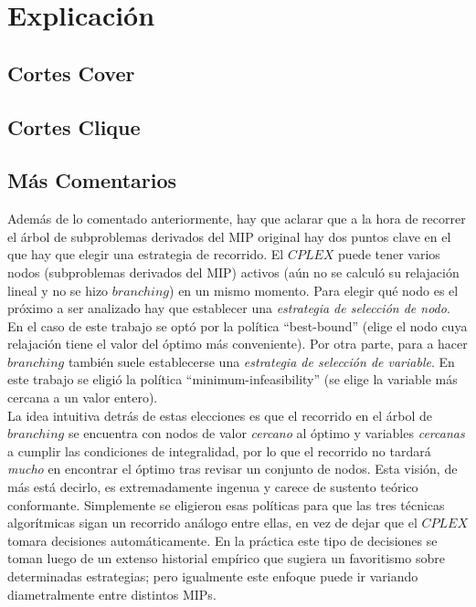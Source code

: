\section{Explicación}

\subsection{Cortes Cover}

\newpage

\newpage

\subsection{Cortes Clique}

\newpage

\newpage

\subsection{Más Comentarios}

Además de lo comentado anteriormente, hay que aclarar que a la hora de recorrer el árbol de subproblemas derivados del MIP original hay dos puntos clave en el que hay que elegir una estrategia de recorrido. El $CPLEX$ puede tener varios nodos (subproblemas derivados del MIP) activos (aún no se calculó su relajación lineal y no se hizo $branching$) en un mismo momento. Para elegir qué nodo es el próximo a ser analizado hay que establecer una \emph{estrategia de selección de nodo}. En el caso de este trabajo se optó por la política ``best-bound'' (elige el nodo cuya relajación tiene el valor del óptimo más conveniente). Por otra parte, para a hacer $branching$ también suele establecerse una \emph{estrategia de selección de variable}. En este trabajo se eligió la política ``minimum-infeasibility'' (se elige la variable más cercana a un valor entero).\\

La idea intuitiva detrás de estas elecciones es que el recorrido en el árbol de $branching$ se encuentra con nodos de valor \emph{cercano} al óptimo y variables \emph{cercanas} a cumplir las condiciones de integralidad, por lo que el recorrido no tardará \emph{mucho} en encontrar el óptimo tras revisar un conjunto de nodos. Esta visión, de más está decirlo, es extremadamente ingenua y carece de sustento teórico conformante. Simplemente se eligieron esas políticas para que las tres técnicas algorítmicas sigan un recorrido análogo entre ellas, en vez de dejar que el $CPLEX$ tomara decisiones automáticamente. En la práctica este tipo de decisiones se toman luego de un extenso historial empírico que sugiera un favoritismo sobre determinadas estrategias; pero igualmente este enfoque puede ir variando diametralmente entre distintos MIPs.
